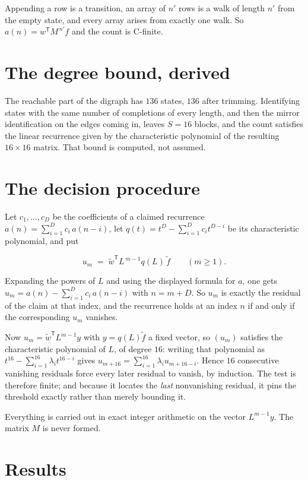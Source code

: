 \documentclass[11pt]{article}
\theoremstyle{definition}
\begin{document}
Appending a row is a transition, an array of $n'$ rows is a walk of length $n'$ from the empty state, and every array arises from exactly one walk. So $a(n) = w^{\mathsf T}M^{\,n'}f$ and the count is C-finite.

\section{The degree bound, derived}

The reachable part of the digraph has $136$ states, $136$ after trimming. Identifying states with the same number of completions of every length, and then the mirror identification on the edges coming in, leaves $S = 16$ blocks, and the count satisfies the linear recurrence given by the characteristic polynomial of the resulting $16\times16$ matrix. That bound is computed, not assumed.

\section{The decision procedure}

Let $c_1,\dots,c_D$ be the coefficients of a claimed recurrence $a(n) = \sum_{i=1}^{D} c_i\,a(n-i)$, let $q(t) = t^{D} - \sum_{i=1}^{D} c_i t^{D-i}$ be its characteristic polynomial, and put

\[u_m \;=\; \tilde w^{\mathsf T} L^{\,m-1} q(L)\,\tilde f \qquad (m \ge 1).\]

Expanding the powers of $L$ and using the displayed formula for $a$, one gets $u_m = a(n) - \sum_{i=1}^{D} c_i\,a(n-i)$ with $n = m + D$. So $u_m$ is exactly the residual of the claim at that index, and the recurrence holds at an index $n$ if and only if the corresponding $u_m$ vanishes.

Now $u_m = \tilde w^{\mathsf T} L^{m-1} y$ with $y = q(L)\tilde f$ a fixed vector, so $(u_m)$ satisfies the characteristic polynomial of $L$, of degree $16$: writing that polynomial as $t^{16} - \sum_{i=1}^{16} \lambda_i t^{16-i}$ gives $u_{m+16} = \sum_{i=1}^{16} \lambda_i u_{m+16-i}$. Hence $16$ consecutive vanishing residuals force every later residual to vanish, by induction. The test is therefore finite; and because it locates the {\itshape last} nonvanishing residual, it pins the threshold exactly rather than merely bounding it.

Everything is carried out in exact integer arithmetic on the vector $L^{m-1}y$. The matrix $M$ is never formed.

\section{Results}
\end{document}
